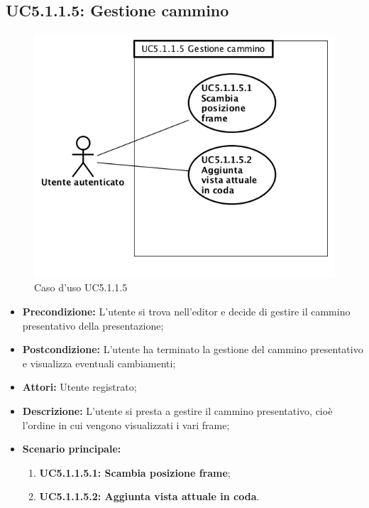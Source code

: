 \subsection{ UC5.1.1.5: Gestione cammino}

\begin{figure}[h]
	\begin{center}
	\includegraphics[scale=0.4]{diagram/UC5-1-1-5.png}
	\caption{Caso d'uso UC5.1.1.5}
	\end{center}
\end{figure}
\begin{itemize}
	\item \textbf{Precondizione:} L’utente si trova nell’editor e decide di gestire il cammino presentativo della presentazione;
	\item \textbf{Postcondizione:} L’utente ha terminato la gestione del cammino presentativo e visualizza eventuali cambiamenti;
	\item \textbf{Attori:} Utente registrato;
	\item \textbf{Descrizione:} L’utente si presta a gestire il cammino presentativo, cioè l’ordine in cui vengono visualizzati i vari frame;
	\item \textbf{Scenario principale:}
	\begin{enumerate}
		\item \textbf{ UC5.1.1.5.1: Scambia posizione frame};
		\item \textbf{ UC5.1.1.5.2: Aggiunta vista attuale in coda}.
	\end{enumerate}
\end{itemize}
